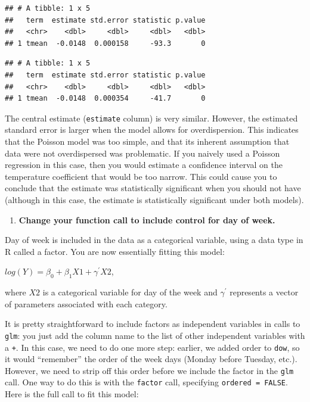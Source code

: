 \documentclass[
]{book}
\newenvironment{Shaded}{\begin{snugshade}}{\end{snugshade}}
\newcommand{\KeywordTok}[1]{\textcolor[rgb]{0.13,0.29,0.53}{\textbf{#1}}}
\newcommand{\NormalTok}[1]{#1}
\newcommand{\OperatorTok}[1]{\textcolor[rgb]{0.81,0.36,0.00}{\textbf{#1}}}
\newcommand{\StringTok}[1]{\textcolor[rgb]{0.31,0.60,0.02}{#1}}
\providecommand{\tightlist}{%
  \setlength{\itemsep}{0pt}\setlength{\parskip}{0pt}}
\begin{document}
\begin{verbatim}
## # A tibble: 1 x 5
##   term  estimate std.error statistic p.value
##   <chr>    <dbl>     <dbl>     <dbl>   <dbl>
## 1 tmean  -0.0148  0.000158     -93.3       0
\end{verbatim}

\begin{Shaded}
\end{Shaded}

\begin{verbatim}
## # A tibble: 1 x 5
##   term  estimate std.error statistic p.value
##   <chr>    <dbl>     <dbl>     <dbl>   <dbl>
## 1 tmean  -0.0148  0.000354     -41.7       0
\end{verbatim}

The central estimate (\texttt{estimate} column) is very similar. However, the estimated
standard error is larger when the model allows for overdispersion. This
indicates that the Poisson model was too simple, and that its inherent
assumption that data were not overdispersed was problematic. If you naively used
a Poisson regression in this case, then you would estimate a confidence
interval on the temperature coefficient that would be too narrow. This could
cause you to conclude that the estimate was statistically significant when
you should not have (although in this case, the estimate is statistically
significant under both models).

\begin{enumerate}
\def\labelenumi{\arabic{enumi}.}
\setcounter{enumi}{3}
\tightlist
\item
  \textbf{Change your function call to include control for day of week.}
\end{enumerate}

Day of week is included in the data as a categorical variable, using a
data type in R called a factor. You are now essentially fitting this model:

\(log(Y)=\beta_{0}+\beta_{1}X1+\gamma^{'}X2\),

where \(X2\) is a categorical variable for day of the week and \(\gamma^{'}\)
represents a vector of parameters associated with each category.

It is pretty straightforward to include factors as independent variables in calls
to \texttt{glm}: you just add the column name to the list of other independent variables
with a \texttt{+}. In this case, we need to do one more step: earlier, we added order to
\texttt{dow}, so it would ``remember'' the order of the week days (Monday before Tuesday,
etc.). However, we need to strip off this order before we include the factor in
the \texttt{glm} call. One way to do this is with the \texttt{factor} call, specifying
\texttt{ordered\ =\ FALSE}. Here is the full call to fit this model:
\end{document}
